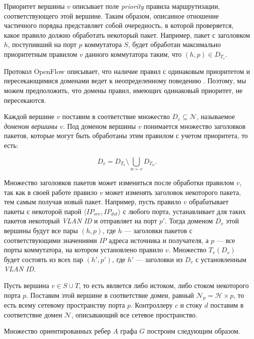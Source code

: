 \documentclass[../thesis.tex]{subfiles}
\begin{document}
Приоритет вершины $v$ описывает поле \textit{priority} правила маршрутизации, соответствующего этой вершине.
Таким образом, описанное отношение частичного порядка представляет собой очередность, в которой проверяется, какое правило должно обработать некоторый пакет.
Например, пакет с заголовком $h$, поступивший на порт $p$ коммутатора $S$, будет обработан максимально приоритетным правилом $v$ данного коммутатора таким, что $(h,p)\in D_{T_v}$.

Протокол OpenFlow описывает, что наличие правил с одинаковым приоритетом и пересекающимися доменами ведет к неопределенному поведению \cite{openflow15}.
Поэтому, мы можем предположить, что домены правил, имеющих одинаковый приоритет, не пересекаются.

Каждой вершине $v$ поставим в соответствие множество $D_{v}\subseteq \mathcal{N}$, называемое \textit{доменом вершины} $v$.
Под доменом вершины $v$ понимается множество заголовков пакетов, которые могут быть обработаны этим правилом с учетом приоритета, то есть:

\begin{equation} \label{eq:vertex_domain}
    D_{v}
    =
    D_{T_v} \setminus \bigcup_{w\succ v} {D_{T_w}}.
\end{equation}

Множество заголовков пакетов может измениться после обработки правилом $v$, так как в своей работе правило $v$ может изменять заголовок некоторого пакета, тем самым получая новый пакет.
Например, пусть правило $v$ обрабатывает пакеты с некоторой парой $\langle IP_{src},IP_{dst}\rangle$ с любого порта, устанавливает для таких пакетов некоторый \textit{VLAN ID} \cite{thaler2013ieee} и отправляет на порт $p'$.
Тогда доменом $D_v$ этой вершины будут все пары $(h,p)$, где $h$ --- заголовки пакетов с соответствующими значениями \textit{IP} адреса источника и получателя, а $p$ --- все порты коммутатора, на котором установлено правило $v$.
Множество $T_v(D_v)$ будет состоять из всех пар $(h',p')$, где $h'$ --- заголовки из $D_v$ с установленным \textit{VLAN ID}.

Пусть вершина $v\in S\cup T$, то есть является либо истоком, либо стоком некоторого порта $p$.
Поставим этой вершине в соответствие домен, равный $\mathcal{N}_p=\mathcal{H}\times p$, то есть всему сетевому пространству порта $p$.
Контроллеру $c$ и стоку $d$ поставим в соответствие домен $\mathcal{N}$, описывающий все сетевое пространство.

Множество ориентированных ребер $A$ графа $G$ построим следующим образом.
\end{document}
